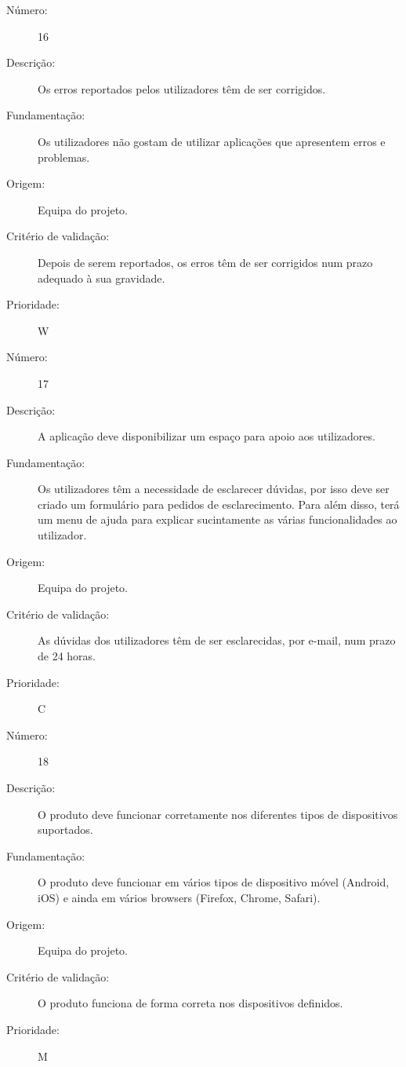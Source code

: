 \documentclass{article}
\begin{document}
      \begin{description}
        \item[Número:]16
        \item[Descrição:]Os erros reportados pelos utilizadores têm de ser corrigidos.
        \item[Fundamentação:] Os utilizadores não gostam de utilizar aplicações que apresentem erros e problemas.
        \item[Origem:]Equipa do projeto.
        \item[Critério de validação:]Depois de serem reportados, os erros têm de ser corrigidos num prazo adequado à sua gravidade.
        \item[Prioridade:]W
      \end{description}
      \vspace{0.5cm}

      \begin{description}
        \item[Número:]17
        \item[Descrição:]A aplicação deve disponibilizar um espaço para apoio aos utilizadores.
        \item[Fundamentação:]Os utilizadores têm a necessidade de esclarecer dúvidas, por isso deve ser criado um formulário para pedidos de esclarecimento. Para além disso, terá um menu de ajuda para explicar sucintamente as várias funcionalidades ao utilizador.
        \item[Origem:]Equipa do projeto.
        \item[Critério de validação:]As dúvidas dos utilizadores têm de ser esclarecidas, por e-mail, num prazo de 24 horas.
        \item[Prioridade:]C
      \end{description}
      \vspace{0.5cm}

            \begin{description}
        \item[Número:]18
        \item[Descrição:]O produto deve funcionar corretamente nos diferentes tipos de dispositivos suportados.
        \item[Fundamentação:]O produto deve funcionar em vários tipos de dispositivo móvel (Android, iOS) e ainda em vários browsers (Firefox, Chrome, Safari).
        \item[Origem:]Equipa do projeto.
        \item[Critério de validação:]O produto funciona de forma correta nos dispositivos definidos.
        \item[Prioridade:]M
      \end{description}
\end{document}
